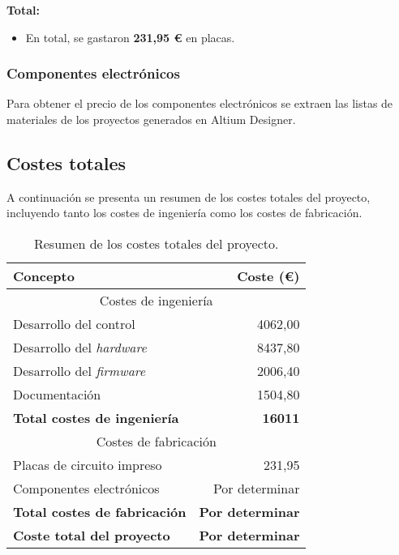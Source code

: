 \hspace{1cm}

\textbf{Total:}
\begin{itemize}
	\item En total, se gastaron \textbf{231,95 \euro{}} en placas.
\end{itemize}
\subsubsection{Componentes electrónicos}
Para obtener el precio de los componentes electrónicos se extraen las listas de materiales de los proyectos generados en Altium Designer.


\subsection{Costes totales}

A continuación se presenta un resumen de los costes totales del proyecto, incluyendo tanto los costes de ingeniería como los costes de fabricación.

\begin{table}[H]
	\centering
	\begin{tabular}{|l|r|}
		\hline
		\textbf{Concepto} & \textbf{Coste (\euro{})} \\
		\hline
		\multicolumn{2}{|c|}{Costes de ingeniería} \\
		\hline
		Desarrollo del control & 4062,00 \\
		Desarrollo del \textit{hardware} & 8437,80 \\
		Desarrollo del \textit{firmware} & 2006,40 \\
		Documentación & 1504,80 \\
		\hline
		\textbf{Total costes de ingeniería} & \textbf{16011} \\
		\hline
		\multicolumn{2}{|c|}{Costes de fabricación} \\
		\hline
		Placas de circuito impreso & 231,95 \\
		Componentes electrónicos & Por determinar \\
		\hline
		\textbf{Total costes de fabricación} & \textbf{Por determinar} \\
		\hline
		\textbf{Coste total del proyecto} & \textbf{Por determinar} \\
		\hline
	\end{tabular}
	\caption{Resumen de los costes totales del proyecto.}
\end{table}


